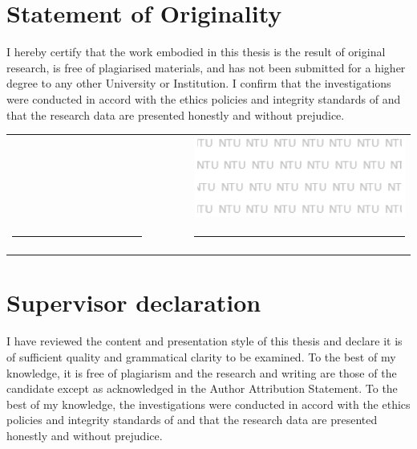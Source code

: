 
\newcommand*{\signaturetable}[1][default]{
  \begingroup
  \noindent
  \renewcommand{\arraystretch}{0} %
  \begin{tabular}{p{0.35\linewidth}p{0.1\linewidth}p{0.55\linewidth}}
    \makecell{\submissiondate \vspace{0.2cm}} &  & \includegraphics[width=\linewidth]{images/logos/ase_watermark.png} \\
    \hrule                                    &  & \hrule                                                             \\
    \makecell[t]{Date}                        &  & \makecell[t]{ #1 }                                                 \\
  \end{tabular}
  \endgroup
}

\chapter*{Statement of Originality}
I hereby certify that the work embodied in this thesis is the result of original research, is free of plagiarised materials, and has not been submitted for a higher degree to any other University or Institution. I confirm that the investigations were conducted in accord with the ethics policies and integrity standards of \schoolname and that the research data are presented honestly and without prejudice.
\vfill

\signaturetable[{
      \authorname
    }]
\vspace{2cm}

\chapter*{Supervisor declaration}

I have reviewed the content and presentation style of this thesis and declare it is of sufficient quality and grammatical clarity to be examined.  To the best of my knowledge, it is free of plagiarism and the research and writing are those of the candidate except as acknowledged in the Author Attribution Statement. To the best of my knowledge, the investigations were conducted in accord with the ethics policies and integrity standards of \schoolname and that the research data are presented honestly and without prejudice.
\vfill


